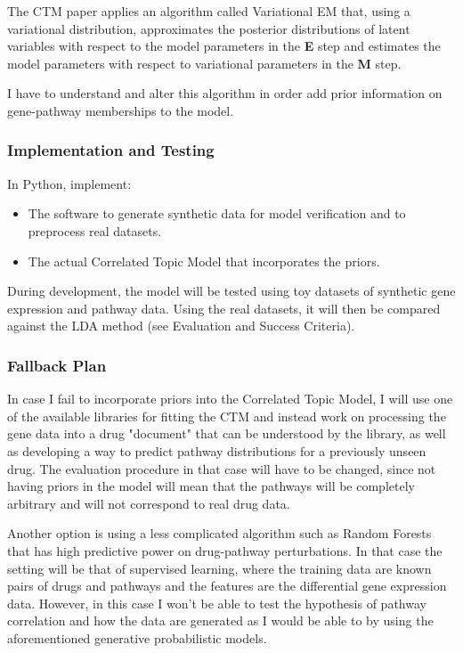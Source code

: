 \documentclass[12pt,a4]{article}
\begin{document}
The CTM paper\cite{2007} applies an algorithm called Variational EM that, using a variational distribution, approximates the posterior distributions of latent variables with respect to the model parameters in the \textbf{E} step and estimates the model parameters with respect to variational parameters in the \textbf{M} step.

I have to understand and alter this algorithm in order add prior information on gene-pathway memberships to the model.

\subsubsection*{Implementation and Testing}

In Python, implement:

\begin{itemize}
\item The software to generate synthetic data for model verification and to preprocess real datasets.
\item The actual Correlated Topic Model that incorporates the priors.
\end{itemize}

During development, the model will be tested using toy datasets of synthetic gene expression and pathway data. Using the real datasets, it will then be compared against the LDA method (see Evaluation and Success Criteria).

\subsubsection*{Fallback Plan}
In case I fail to incorporate priors into the Correlated Topic Model, I will use one of the available libraries for fitting the CTM and instead work on processing the gene data into a drug "document" that can be understood by the library, as well as developing a way to predict pathway distributions for a previously unseen drug. The evaluation procedure in that case will have to be changed, since not having priors in the model will mean that the pathways will be completely arbitrary and will not correspond to real drug data.

Another option is using a less complicated algorithm such as Random Forests that has high predictive power on drug-pathway perturbations\cite{Riddick15012011}. In that case the setting will be that of supervised learning, where the training data are known pairs of drugs and pathways and the features are the differential gene expression data. However, in this case I won't be able to test the hypothesis of pathway correlation and how the data are generated as I would be able to by using the aforementioned generative probabilistic models.
\end{document}
